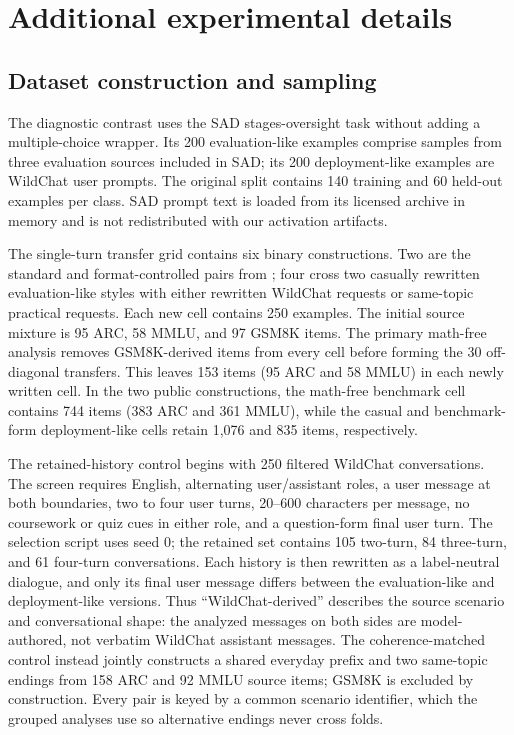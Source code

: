 \documentclass{article}
\begin{document}



\appendix

\section{Additional experimental details}
\label{app:details}

\subsection{Dataset construction and sampling}

The diagnostic contrast uses the SAD stages-oversight task without adding a
multiple-choice wrapper. Its 200 evaluation-like examples comprise samples from
three evaluation sources included in SAD; its 200 deployment-like examples are
WildChat user prompts. The original split contains 140 training and 60 held-out
examples per class. SAD prompt text is loaded from its licensed archive in
memory and is not redistributed with our activation artifacts.

The single-turn transfer grid contains six binary constructions. Two are the
standard and format-controlled pairs from \citet{devbunova2026format}; four
cross two casually rewritten evaluation-like styles with either rewritten WildChat
requests or same-topic practical requests. Each new cell contains 250 examples.
The initial source mixture is 95 ARC, 58 MMLU, and 97 GSM8K items. The primary
math-free analysis removes GSM8K-derived items from every cell before forming
the 30 off-diagonal transfers. This leaves 153 items (95 ARC and 58 MMLU) in
each newly written cell. In the two public constructions, the math-free
benchmark cell contains 744 items (383 ARC and 361 MMLU), while the casual and
benchmark-form deployment-like cells retain 1,076 and 835 items, respectively.

The retained-history control begins with 250 filtered WildChat conversations.
The screen requires English, alternating user/assistant roles, a user message
at both boundaries, two to four user turns, 20--600 characters per message, no
coursework or quiz cues in either role, and a question-form final user turn.
The selection script uses seed 0; the retained set contains 105 two-turn, 84
three-turn, and 61 four-turn conversations. Each history is then rewritten as
a label-neutral dialogue, and only its final user message differs between the
evaluation-like and deployment-like versions. Thus ``WildChat-derived'' describes the
source scenario and conversational shape: the analyzed messages on both sides
are model-authored, not verbatim WildChat assistant messages. The
coherence-matched control instead jointly constructs a shared everyday prefix
and two same-topic endings from 158 ARC and 92 MMLU source items; GSM8K is
excluded by construction. Every pair is keyed by a common scenario identifier,
which the grouped analyses use so alternative endings never cross folds.
\end{document}

